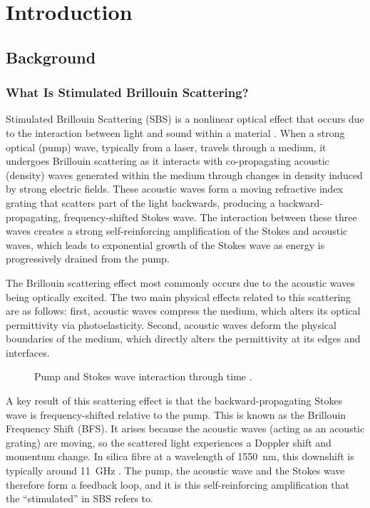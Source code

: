 \chapter{Introduction}

\section{Background}

\subsection{What Is Stimulated Brillouin Scattering?}

Stimulated Brillouin Scattering (SBS) is a nonlinear optical effect that occurs due to the interaction between light and sound within a material 
\parencite{eggletonBrillouinScatteringPart2022}. When a strong optical (pump) wave, typically from a laser, travels through a medium, 
it undergoes Brillouin scattering as it interacts with co-propagating acoustic (density) waves generated within the medium through 
changes in density induced by strong electric fields. These acoustic waves form a moving refractive index grating 
that scatters part of the light backwards, producing a backward-propagating, frequency-shifted Stokes wave. 
The interaction between these three waves creates a strong self-reinforcing amplification of the Stokes and acoustic waves, 
which leads to exponential growth of the Stokes wave as energy is progressively drained from the pump.

The Brillouin scattering effect most commonly occurs due to the acoustic waves being optically excited. 
The two main physical effects related to this scattering are as follows: first, acoustic waves compress the medium, which alters 
its optical permittivity via photoelasticity. Second, acoustic waves deform the physical boundaries of the medium, which directly 
alters the permittivity at its edges and interfaces.

\begin{figure}
  \centering
  \caption{Pump and Stokes wave interaction through time \parencite{baiStimulatedBrillouinScattering2018}.}
  \label{fig:SBSWithLevels}
\end{figure}

A key result of this scattering effect is that the backward-propagating Stokes wave is frequency-shifted relative to the pump. 
This is known as the Brillouin Frequency Shift (BFS). It arises because the acoustic waves (acting as an acoustic grating) are moving, 
so the scattered light experiences a Doppler shift and momentum change. In silica fibre at a wavelength of \qty{1550}{\nano\metre}, 
this downshift is typically around \qty{11}{\giga\hertz} \parencite{agrawalNonlinearFiberOptics2019}. The pump, the acoustic wave and 
the Stokes wave therefore form a feedback loop, and it is this self-reinforcing amplification that the \enquote{stimulated} in SBS refers to.

